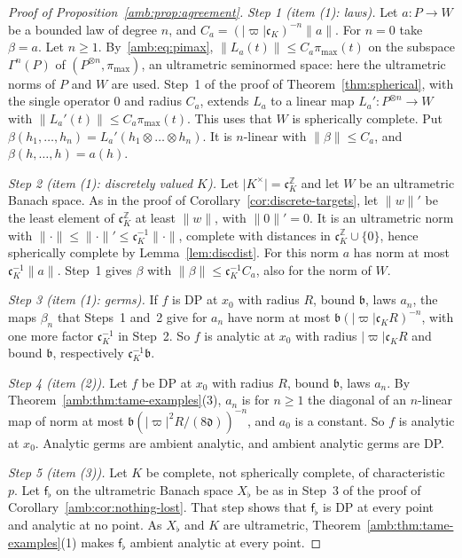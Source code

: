 \documentclass[11pt]{amsart}
\theoremstyle{definition}
\theoremstyle{remark}
\numberwithin{equation}{section}
\newcommand{\Z}{\mathbb Z}
\newcommand{\abs}[1]{\lvert #1\rvert}
\newcommand{\norm}[1]{\lVert #1\rVert}
\theoremstyle{plain}
\theoremstyle{definition}
\theoremstyle{plain}
\begin{document}
\begin{proof}[Proof of Proposition~\ref{amb:prop:agreement}]
\emph{Step 1 (item (1): laws).} Let $a\colon P\to W$ be a bounded law of degree $n$, and $C_a=(\abs\varpi\mathfrak c_K)^{-n}\norm a$.
For $n=0$ take $\beta=a$. Let $n\ge1$. By~\eqref{amb:eq:pimax}, $\norm{L_a(t)}\le C_a\pi_{\max}(t)$ on the subspace $\Gamma^n(P)$ of
$(P^{\otimes n},\pi_{\max})$, an ultrametric seminormed space: here the ultrametric norms of $P$ and $W$ are used. Step~1 of the proof
of Theorem~\ref{thm:spherical}, with the single operator $0$ and radius $C_a$, extends $L_a$ to a linear map $L_a'\colon
P^{\otimes n}\to W$ with $\norm{L_a'(t)}\le C_a\pi_{\max}(t)$. This uses that $W$ is spherically complete. Put
$\beta(h_1,\dots,h_n)=L_a'(h_1\otimes\dots\otimes h_n)$. It is $n$\nobreakdash-linear with $\norm\beta\le C_a$, and
$\beta(h,\dots,h)=a(h)$.

\emph{Step 2 (item (1): discretely valued $K$).} Let $\abs{K^\times}=\mathfrak c_K^{\Z}$ and let $W$ be an ultrametric Banach space.
As in the proof of Corollary~\ref{cor:discrete-targets}, let $\norm w'$ be the least element of $\mathfrak c_K^{\Z}$ at least
$\norm w$, with $\norm0'=0$. It is an ultrametric norm with $\norm\cdot\le\norm\cdot'\le\mathfrak c_K^{-1}\norm\cdot$, complete with
distances in $\mathfrak c_K^{\Z}\cup\{0\}$, hence spherically complete by Lemma~\ref{lem:discdist}. For this norm $a$ has norm at
most $\mathfrak c_K^{-1}\norm a$. Step~1 gives $\beta$ with $\norm\beta\le\mathfrak c_K^{-1}C_a$, also for the norm of $W$.

\emph{Step 3 (item (1): germs).} If $f$ is DP at $x_0$ with radius $R$, bound $\mathfrak b$, laws $a_n$, the maps $\beta_n$ that Steps~1 and~2 give for $a_n$ have norm at most
$\mathfrak b(\abs\varpi\mathfrak c_KR)^{-n}$, with one more factor $\mathfrak c_K^{-1}$ in Step~2. So $f$ is analytic at $x_0$ with radius
$\abs\varpi\mathfrak c_KR$ and bound $\mathfrak b$, respectively $\mathfrak c_K^{-1}\mathfrak b$.

\emph{Step 4 (item (2)).} Let $f$ be DP at $x_0$ with radius $R$, bound $\mathfrak b$, laws $a_n$. By
Theorem~\ref{amb:thm:tame-examples}(3), $a_n$ is for $n\ge1$ the diagonal of an $n$-linear map of norm at most $\mathfrak b(\abs\varpi^2R/(8\mathfrak d))^{-n}$, and $a_0$ is a constant. So $f$ is
analytic at $x_0$. Analytic germs are ambient analytic, and ambient analytic germs are DP.

\emph{Step 5 (item (3)).} Let $K$ be complete, not spherically complete, of characteristic $p$. Let $\mathsf f_\flat$ on the ultrametric Banach space $X_\flat$ be as in Step~3 of the proof of
Corollary~\ref{amb:cor:nothing-lost}. That step shows that $\mathsf f_\flat$ is DP at every point and analytic at no point. As $X_\flat$ and $K$ are ultrametric, Theorem~\ref{amb:thm:tame-examples}(1) makes $\mathsf f_\flat$ ambient analytic at every point.
\end{proof}
\end{document}
